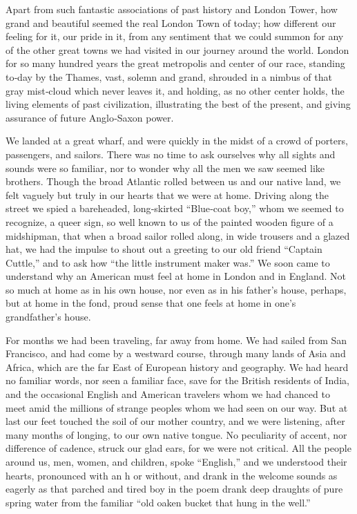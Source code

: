 \documentclass[12pt]{book}
\begin{document}
Apart from such fantastic associations of past history and London Tower,
how grand and beautiful seemed the real London Town of today; how different
our feeling for it, our pride in it, from any sentiment that we could summon for
any of the other great towns we had visited in our journey around the world.
London for so many hundred years the great metropolis and center of our race,
standing to‐day by the Thames, vast, solemn and grand, shrouded in a nimbus of
that gray mist‐cloud which never leaves it, and holding, as no other center holds,
the living elements of past civilization, illustrating the best of the present, and
giving assurance of future Anglo‐Saxon power.

We landed at a great wharf, and were quickly in the midst of a crowd of
porters, passengers, and sailors. There was no time to ask ourselves why all sights
and sounds were so familiar, nor to wonder why all the men we saw seemed
like brothers. Though the broad Atlantic rolled between us and our native land,
we felt vaguely but truly in our hearts that we were at home. Driving along the
street we spied a bareheaded, long‐skirted “Blue‐coat boy,” whom we seemed to
recognize, a queer sign, so well known to us of the painted wooden figure of a
midshipman, that when a broad sailor rolled along, in wide trousers and a glazed
hat, we had the impulse to shout out a greeting to our old friend “Captain Cuttle,”
and to ask how “the little instrument maker was.” We soon came to understand
why an American must feel at home in London and in England. Not so much at
home as in his own house, nor even as in his father’s house, perhaps, but at home
in the fond, proud sense that one feels at home in one’s grandfather’s house.

For months we had been traveling, far away from home. We had sailed from
San Francisco, and had come by a westward course, through many lands of Asia
and Africa, which are the far East of European history and geography. We had
heard no familiar words, nor seen a familiar face, save for the British residents of
India, and the occasional English and American travelers whom we had chanced
to meet amid the millions of strange peoples whom we had seen on our way. But
at last our feet touched the soil of our mother country, and we were listening,
after many months of longing, to our own native tongue. No peculiarity of accent,
nor difference of cadence, struck our glad ears, for we were not critical. All the
people around us, men, women, and children, spoke “English,” and we understood
their hearts, pronounced with an h or without, and drank in the welcome sounds
as eagerly as that parched and tired boy in the poem drank deep draughts of pure
spring water from the familiar “old oaken bucket that hung in the well.”
\end{document}
